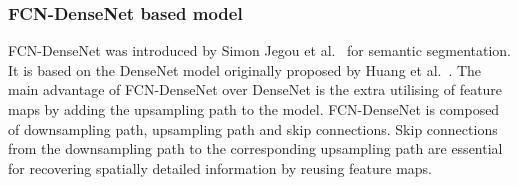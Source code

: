 	\subsubsection{FCN-DenseNet based model}
	FCN-DenseNet was introduced by Simon Jegou et al.~\cite{jegou2017one} for semantic segmentation.
	It is based on the DenseNet model originally proposed by Huang et al.~\cite{Huang}. 
	The main advantage of FCN-DenseNet over DenseNet is the extra utilising of feature maps by adding the upsampling path to the model.
	FCN-DenseNet is composed of downsampling path, upsampling path and skip connections.
	Skip connections from the downsampling path to the corresponding upsampling path are essential for recovering spatially detailed information by reusing feature maps.

